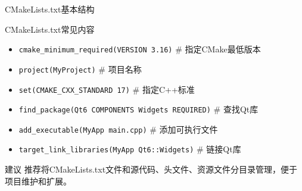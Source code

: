 \documentclass[UTF8,aspectratio=169]{beamer}
\begin{document}
\begin{frame}[fragile]{CMakeLists.txt基本结构}
    \begin{ytublock}{CMakeLists.txt常见内容}
        \begin{itemize}
            \item \texttt{cmake\_minimum\_required(VERSION 3.16)} \hspace{1em} \# 指定CMake最低版本
            \item \texttt{project(MyProject)} \hspace{1em} \# 项目名称
            \item \texttt{set(CMAKE\_CXX\_STANDARD 17)} \hspace{1em} \# 指定C++标准
            \item \texttt{find\_package(Qt6 COMPONENTS Widgets REQUIRED)} \hspace{1em} \# 查找Qt库
            \item \texttt{add\_executable(MyApp main.cpp)} \hspace{1em} \# 添加可执行文件
            \item \texttt{target\_link\_libraries(MyApp Qt6::Widgets)} \hspace{1em} \# 链接Qt库
        \end{itemize}
    \end{ytublock}
    \vspace{0.5em}
    \begin{ytualertblock}{建议}
        推荐将CMakeLists.txt文件和源代码、头文件、资源文件分目录管理，便于项目维护和扩展。
    \end{ytualertblock}
\end{frame}
\end{document}
